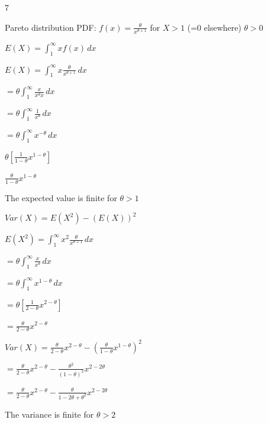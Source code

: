 \documentclass[12 pt]{article}
\begin{document}
    \begin{exercise}{7}
    \hfill

    Pareto distribution PDF: $f(x) = \frac{\theta}{x^{\theta + 1}}$ for $X > 1$ (=0 elsewhere) $\theta > 0$

    $E(X) = \int_{1}^{\infty} x f(x) \,dx $

    $E(X) = \int_{1}^{\infty} x \frac{\theta}{x^{\theta + 1}} \,dx $

    $= \theta \int_{1}^{\infty} \frac{x}{x^{\theta}x} \,dx $

    $= \theta \int_{1}^{\infty} \frac{1}{x^{\theta}} \,dx $

    $= \theta \int_{1}^{\infty} x^{-\theta} \,dx $

    $\theta [\frac{1}{1 - \theta} x^{1 - \theta}]$

    $\frac{\theta}{1 - \theta} x^{1 - \theta}$

    The expected value is finite for $\theta > 1$

    \hfill

    $Var(X) = E(X^2) - (E(X))^2$

    \hfill

    $E(X^2) = \int_{1}^{\infty} x^2 \frac{\theta}{x^{\theta + 1}} \,dx $

    $= \theta \int_{1}^{\infty} \frac{x}{x^{\theta}} \,dx $

    $= \theta \int_{1}^{\infty} x^{1- \theta} \,dx $

    $= \theta [\frac{1}{2 - \theta} x^{2- \theta}]$

    $= \frac{\theta}{2 - \theta} x^{2 - \theta}$

    \hfill

    $Var(X) = \frac{\theta}{2 - \theta} x^{2 - \theta} - (\frac{\theta}{1 - \theta} x^{1 - \theta} )^2$

    $= \frac{\theta}{2 - \theta} x^{2 - \theta} - \frac{{\theta}^2}{(1- \theta)^2} x^{2 -2 \theta}$

    $= \frac{\theta}{2 - \theta} x^{2 - \theta} - \frac{\theta}{1 - 2 \theta + {\theta}^2} x^{2- 2\theta}$

    The variance is finite for $\theta > 2$

    \hfill
    \end{exercise}
\end{document}
